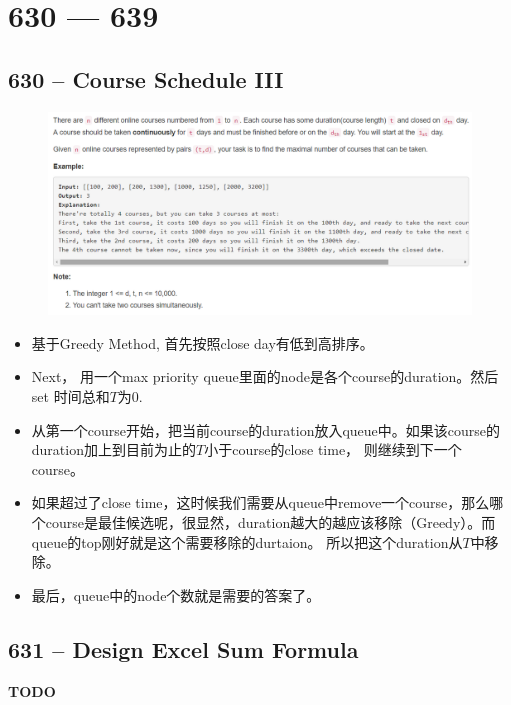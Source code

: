 \documentclass[a4paper,12pt]{article}
\begin{document}
\section{630 --- 639}
\subsection{630 -- Course Schedule III}
\begin{figure}[H]
	\begin{center}
		\includegraphics[width=18cm]{630.png}
	\end{center}
\end{figure}
\begin{CJK*}{UTF8}{gbsn}
	\begin{itemize}
		\item 基于Greedy Method, 首先按照close day有低到高排序。
		\item Next， 用一个max priority queue里面的node是各个course的duration。然后set 时间总和$T$为$0$.
		\item 从第一个course开始，把当前course的duration放入queue中。如果该course的duration加上到目前为止的$T$小于course的close time， 则继续到下一个course。
		\item 如果超过了close time，这时候我们需要从queue中remove一个course，那么哪个course是最佳候选呢，很显然，duration越大的越应该移除（Greedy）。而queue的top刚好就是这个需要移除的durtaion。 所以把这个duration从$T$中移除。
		\item 最后，queue中的node个数就是需要的答案了。
	\end{itemize}
\clearpage
\end{CJK*}

\subsection{631 -- Design Excel Sum Formula}
\textbf{\Huge{TODO}}
\end{document}
